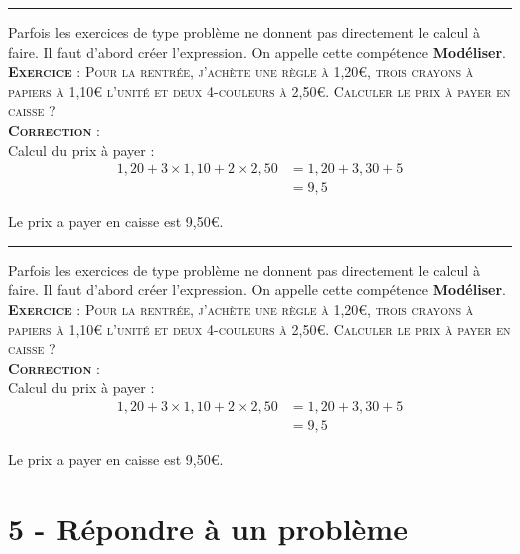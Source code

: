 \documentclass[11pt]{article}
\newcommand{\horrule}[1]{\rule{\linewidth}{#1}} %
\begin{document}
\vspace{0.5cm}\horrule{1px}\vspace{0.5cm}

Parfois les exercices de type problème ne donnent pas directement le calcul à faire. Il faut d'abord créer l'expression. On appelle cette compétence \textbf{Modéliser}.\\

\textsc{\textbf{Exercice} : Pour la rentrée, j'achète une règle à 1,20€, trois crayons à papiers à 1,10€ l'unité et deux 4-couleurs à 2,50€.} \newline
\textsc{Calculer le prix à payer en caisse ?}\\

\textsc{\textbf{Correction} :}\\

Calcul du prix à payer :
\begin{align*}
1,20 + 3 \times 1,10 + 2 \times 2,50 &= 1,20 + 3,30 + 5 \\
                                     &= 9,5
\end{align*}

Le prix a payer en caisse est 9,50€.

\vspace{0.5cm}\horrule{1px}\vspace{0.5cm}

Parfois les exercices de type problème ne donnent pas directement le calcul à faire. Il faut d'abord créer l'expression. On appelle cette compétence \textbf{Modéliser}.\\

\textsc{\textbf{Exercice} : Pour la rentrée, j'achète une règle à 1,20€, trois crayons à papiers à 1,10€ l'unité et deux 4-couleurs à 2,50€.} \newline
\textsc{Calculer le prix à payer en caisse ?}\\

\textsc{\textbf{Correction} :}\\

Calcul du prix à payer :
\begin{align*}
1,20 + 3 \times 1,10 + 2 \times 2,50 &= 1,20 + 3,30 + 5 \\
                                     &= 9,5
\end{align*}

Le prix a payer en caisse est 9,50€.

\newpage

\section*{5 - Répondre à un problème}
\end{document}
